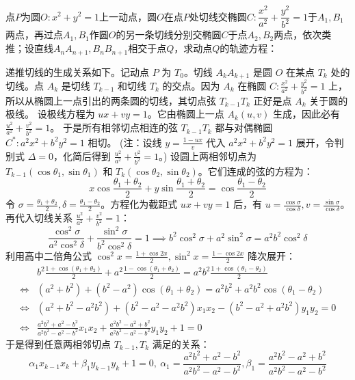 \begin{exercise}
点$P$为圆$O:x^{2}+y^{2}=1$上一动点，圆$O$在点$P$处切线交椭圆$C:\dfrac{x^{2}}{a^2}+\dfrac{y^{2}}{b^2}=1$于$A_{1},B_{1}$两点，再过点$A_{1},B_{1}$作圆$O$的另一条切线分别交椭圆$C$于点$A_{2},B_{2}$两点，依次类推；设直线$A_{n}A_{n+1},B_{n}B_{n+1}$相交于点$Q$，求动点$Q$的轨迹方程：
\end{exercise}
\begin{solution}
递推切线的生成关系如下。记动点 $P$ 为 $T_0$。切线 $A_k A_{k+1}$ 是圆 $O$ 在某点 $T_k$ 处的切线。点 $A_k$ 是切线 $T_{k-1}$ 和切线 $T_k$ 的交点。因为 $A_k$ 在椭圆 $C: \frac{x^2}{a^2} + \frac{y^2}{b^2} = 1$ 上，所以从椭圆上一点引出的两条圆的切线，其切点弦 $T_{k-1} T_k$ 正好是点 $A_k$ 关于圆的极线。
设极线方程为 $ux + vy = 1$。它由椭圆上一点 $A_k(u, v)$ 生成，因此必有 $\frac{u^2}{a^2} + \frac{v^2}{b^2} = 1$。
于是所有相邻切点相连的弦 $T_{k-1} T_k$ 都与对偶椭圆 $C^*: a^2 x^2 + b^2 y^2 = 1$ 相切。
(注：设线 $y = \frac{1-ux}{v}$ 代入 $a^2x^2+b^2y^2=1$ 展开，令判别式 $\Delta=0$，化简后得到 $\frac{u^2}{a^2} + \frac{v^2}{b^2} = 1$。)
设圆上两相邻切点为 $T_{k-1}(\cos\theta_1, \sin\theta_1)$ 和 $T_k(\cos\theta_2, \sin\theta_2)$。它们连成的弦的方程为：
$$x \cos\frac{\theta_1+\theta_2}{2} + y \sin\frac{\theta_1+\theta_2}{2} = \cos\frac{\theta_1-\theta_2}{2}$$
令 $\sigma = \frac{\theta_1+\theta_2}{2}, \delta = \frac{\theta_1-\theta_2}{2}$。方程化为截距式 $ux+vy=1$ 后，有 $u = \frac{\cos\sigma}{\cos\delta}, v = \frac{\sin\sigma}{\cos\delta}$。再代入切线关系 $\frac{u^2}{a^2} + \frac{v^2}{b^2} = 1$：
$$\frac{\cos^2\sigma}{a^2 \cos^2\delta} + \frac{\sin^2\sigma}{b^2 \cos^2\delta} = 1 \implies b^2 \cos^2\sigma + a^2 \sin^2\sigma = a^2 b^2 \cos^2\delta$$
利用高中二倍角公式 $\cos^2 x = \frac{1+\cos 2x}{2}, \sin^2 x = \frac{1-\cos 2x}{2}$ 降次展开：
\begin{align*}
& b^2 \frac{1+\cos(\theta_1+\theta_2)}{2} + a^2 \frac{1-\cos(\theta_1+\theta_2)}{2} = a^2 b^2 \frac{1+\cos(\theta_1-\theta_2)}{2}\\
\Leftrightarrow & (a^2+b^2) + (b^2-a^2)\cos(\theta_1+\theta_2) = a^2 b^2 + a^2 b^2\cos(\theta_1-\theta_2)\\
\Leftrightarrow & (a^2+b^2-a^2 b^2) + (b^2-a^2 - a^2 b^2)x_1 x_2 - (b^2-a^2 + a^2 b^2)y_1 y_2 = 0\\
\Leftrightarrow & \frac{a^2 b^2 + a^2 - b^2}{a^2 b^2 - a^2 - b^2} x_1 x_2 + \frac{a^2 b^2 - a^2 + b^2}{a^2 b^2 - a^2 - b^2} y_1 y_2 + 1 = 0
\end{align*}
于是得到任意两相邻切点 $T_{k-1}, T_k$ 满足的关系：
\[\alpha_1 x_{k-1} x_k + \beta_1 y_{k-1} y_k + 1 = 0,~\alpha_1 = \frac{a^2 b^2 + a^2 - b^2}{a^2 b^2 - a^2 - b^2}, \beta_1 = \frac{a^2 b^2 - a^2 + b^2}{a^2 b^2 - a^2 - b^2}\]

\end{solution}
